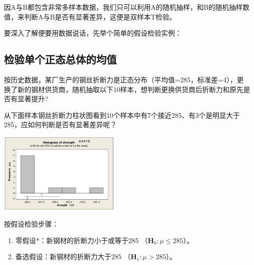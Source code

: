 因A与B都包含非常多样本数据，我们只可以利用A的随机抽样，和B的随机抽样数值，来判断A与B是否有显著差异，这便是双样本T检验。

要深入了解便要用数据说话，先举个简单的假设检验实例：

\hypertarget{ux68c0ux9a8cux5355ux4e2aux6b63ux6001ux603bux4f53ux7684ux5747ux503c}{%
\subsection{检验单个正态总体的均值}\label{ux68c0ux9a8cux5355ux4e2aux6b63ux6001ux603bux4f53ux7684ux5747ux503c}}

按历史数据，某厂生产的钢丝折断力是正态分布（平均值=285，标准差=4），更换了新的钢材供货商，随机抽取以下10样本，想判断更换供货商后折断力和原先是否有显著提升?

\begin{description}
\item[]
\end{description}

从下面样本钢丝折断力柱状图看到10个样本中有7个接近285、有3个是明显大于285，应如何判断是否有显著差异呢？


\includegraphics[width=6cm]{1sigmaUnknownHistogram_of_strength-1.jpg}

按假设检验步骤：

\begin{enumerate}
\tightlist
\item
  零假设*：新钢材的折断力小于或等于285
  （\(\mathbf{H}_0: \mu \le 285\)）。
\item
  备选假设：新钢材的折断力大于285 （\(\mathbf{H}_1: \mu > 285\)）。
\end{enumerate}

\begin{description}
\item[]
\end{description}

